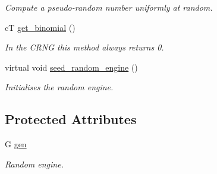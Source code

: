 \begin{DoxyCompactItemize}
\begin{DoxyCompactList}\small\item\em Compute a pseudo-\/random number uniformly at random. \end{DoxyCompactList}\item 
cT \hyperlink{classlgraph_1_1utils_1_1crandom__generator_ac1f724180b858b6a1f67451060de6896}{get\+\_\+binomial} ()\hypertarget{classlgraph_1_1utils_1_1crandom__generator_ac1f724180b858b6a1f67451060de6896}{}\label{classlgraph_1_1utils_1_1crandom__generator_ac1f724180b858b6a1f67451060de6896}

\begin{DoxyCompactList}\small\item\em In the C\+R\+NG this method always returns 0. \end{DoxyCompactList}\item 
virtual void \hyperlink{classlgraph_1_1utils_1_1random__generator_a4eb6998070eecb59bd89dca92d8a509c}{seed\+\_\+random\+\_\+engine} ()\hypertarget{classlgraph_1_1utils_1_1random__generator_a4eb6998070eecb59bd89dca92d8a509c}{}\label{classlgraph_1_1utils_1_1random__generator_a4eb6998070eecb59bd89dca92d8a509c}

\begin{DoxyCompactList}\small\item\em Initialises the random engine. \end{DoxyCompactList}\end{DoxyCompactItemize}
\subsection*{Protected Attributes}
\begin{DoxyCompactItemize}
\item 
G \hyperlink{classlgraph_1_1utils_1_1random__generator_a18353876b4c2d3a18aee454b5750a0a0}{gen}\hypertarget{classlgraph_1_1utils_1_1random__generator_a18353876b4c2d3a18aee454b5750a0a0}{}\label{classlgraph_1_1utils_1_1random__generator_a18353876b4c2d3a18aee454b5750a0a0}

\begin{DoxyCompactList}\small\item\em Random engine. \end{DoxyCompactList}\end{DoxyCompactItemize}
